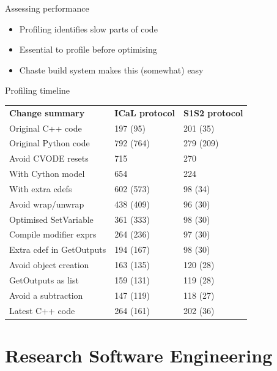 \documentclass[t,xcolor={usenames,dvipsnames}]{beamer}
\begin{document}
\begin{frame}{Assessing performance}
\begin{itemize}
\item \alert{Profiling} identifies slow parts of code
\item Essential to profile before optimising
\item Chaste build system makes this (somewhat) easy
\end{itemize}
\end{frame}


\begin{frame}{Profiling timeline}
\begin{tabular}{l|ll}
\textbf{Change summary} & \textbf{ICaL protocol} & \textbf{S1S2 protocol} \\
Original C++ code       & 197 (95)               & 201 (35) \\
\hline
Original Python code    & 792 (764)              & 279 (209) \\
Avoid CVODE resets      & 715                    & 270 \\
With Cython model       & 654                    & 224 \\
With extra cdefs        & 602 (573)              & 98 (34) \\
Avoid wrap/unwrap       & 438 (409)              & 96 (30) \\
Optimised SetVariable   & 361 (333)              & 98 (30) \\
Compile modifier exprs  & 264 (236)              & 97 (30) \\
Extra cdef in GetOutputs& 194 (167)              & 98 (30) \\
\hline
Avoid object creation   & 163 (135)              & 120 (28) \\
GetOutputs as list      & 159 (131)              & 119 (28) \\
Avoid a subtraction     & 147 (119)              & 118 (27) \\
\hline
Latest C++ code         & 264 (161)              & 202 (36) \\
\end{tabular}
\end{frame}


\section{Research Software Engineering}
\end{document}
